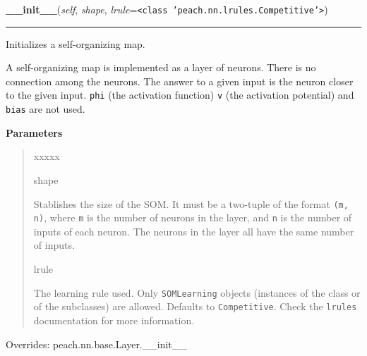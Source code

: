     \begin{boxedminipage}{\textwidth}

    \raggedright \textbf{\_\_init\_\_}(\textit{self}, \textit{shape}, \textit{lrule}=\texttt{{\textless}class 'peach.nn.lrules.Competitive'{\textgreater}})

    \vspace{-1.5ex}

    \rule{\textwidth}{0.5\fboxrule}

Initializes a self-organizing map.

A self-organizing map is implemented as a layer of neurons. There is no
connection among the neurons. The answer to a given input is the neuron
closer to the given input. \texttt{phi} (the activation function) \texttt{v} (the
activation potential) and \texttt{bias} are not used.
    \vspace{1ex}

      \textbf{Parameters}
      \begin{quote}
        \begin{Ventry}{xxxxx}

          \item[shape]


Stablishes the size of the SOM. It must be a two-tuple of the
format \texttt{(m, n)}, where \texttt{m} is the number of neurons in the
layer, and \texttt{n} is the number of inputs of each neuron. The neurons
in the layer all have the same number of inputs.
          \item[lrule]


The learning rule used. Only \texttt{SOMLearning} objects (instances of
the class or of the subclasses) are allowed. Defaults to
\texttt{Competitive}. Check the \texttt{lrules} documentation for more
information.
        \end{Ventry}

      \end{quote}

    \vspace{1ex}

      Overrides: peach.nn.base.Layer.\_\_init\_\_

    \end{boxedminipage}

    \label{peach:nn:nn:SOM:__gety}

    \vspace{0.5ex}

